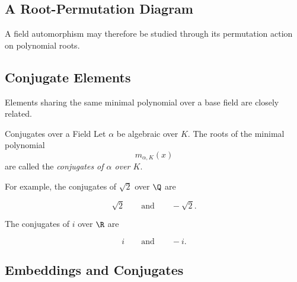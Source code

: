 \subsection{A Root-Permutation Diagram}
\label{subsec:galois-root-permutation-diagram}

\begin{center}
\end{center}

A field automorphism may therefore be studied through its permutation action
on polynomial roots.

\subsection{Conjugate Elements}
\label{subsec:galois-conjugates}

Elements sharing the same minimal polynomial over a base field are closely
related.

\begin{definitionbox}{Conjugates over a Field}
Let \(\alpha\) be algebraic over \(K\). The roots of the minimal polynomial
\[ m_{\alpha,K}(x) \]
are called the \emph{conjugates of \(\alpha\) over \(K\)}.
\end{definitionbox}

For example, the conjugates of \(\sqrt2\) over \(\Q\) are

\[ \sqrt2\qquad\text{and}\qquad-\sqrt2. \]

The conjugates of \(i\) over \(\R\) are

\[ i\qquad\text{and}\qquad-i. \]

\subsection{Embeddings and Conjugates}
\label{subsec:embeddings-conjugates}

